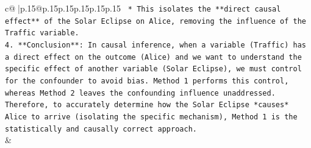 \documentclass{article}
\begin{document}
{\begin{supertabular}{c@{$\;$}|p{.15\linewidth}@{}p{.15\linewidth}p{.15\linewidth}p{.15\linewidth}p{.15\linewidth}p{.15\linewidth}}
{{{\texttt{    *   This isolates the **direct causal effect** of the Solar Eclipse on Alice, removing the influence of the Traffic variable.} \\
\texttt{4.  **Conclusion**: In causal inference, when a variable (Traffic) has a direct effect on the outcome (Alice) and we want to understand the specific effect of another variable (Solar Eclipse), we must control for the confounder to avoid bias. Method 1 performs this control, whereas Method 2 leaves the confounding influence unaddressed. Therefore, to accurately determine how the Solar Eclipse *causes* Alice to arrive (isolating the specific mechanism), Method 1 is the statistically and causally correct approach.} \\
            }
        }
    }
    & \\ \\


\end{supertabular}}
\end{document}
